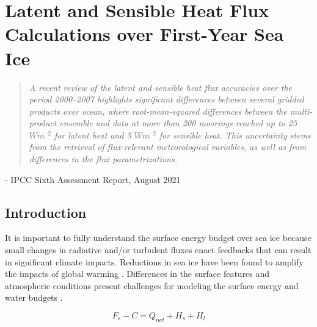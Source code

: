 \chapter{Latent and Sensible Heat Flux Calculations over First-Year Sea Ice}
\vspace{1 cm}
\begin{spacing}{1} \begin{quote} 
\noindent \emph{A recent review of the latent and sensible heat flux accuracies over the period 2000–2007 highlights significant differences between several gridded products over ocean, where root-mean-squared differences between the multi-product ensemble and data at more than 200  moorings reached up to 25 $W m^{–2}$ for latent heat and 5 $W m^{–2}$ for sensible heat. This uncertainty stems from the retrieval of flux-relevant meteorological variables, as well as from differences in the flux parametrizations.} \end{quote}
\hspace{6 cm} - IPCC Sixth Assessment Report, August 2021  
\end{spacing}
\doublespacing
\section{Introduction}
It is important to fully understand the surface energy budget over sea ice because small changes in radiative and/or turbulent fluxes enact feedbacks that can result in significant climate impacts. Reductions in sea ice have been found to amplify the impacts of global warming \citep{wunderling:2020, ipcc_techsum}. Differences in the surface features and atmospheric conditions present challenges for modeling the surface energy and water budgets \citep{wang:2009}. 

\begin{equation}\label{eq:seb}
F_{s} - C = Q_{net} + H_{s} + H_{l}
\end{equation}

